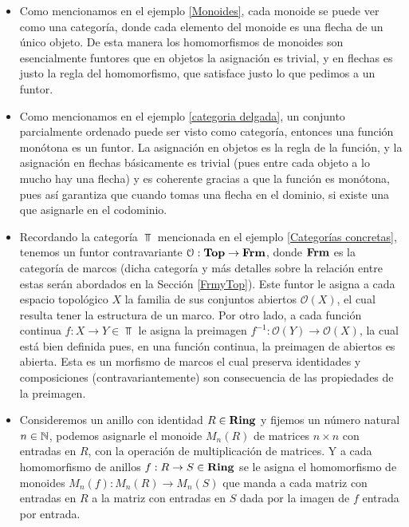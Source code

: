 \documentclass{comunicaciones}
\begin{document}
\begin{ej}
    \begin{itemize}
        \item Como mencionamos en el ejemplo \ref{Monoides}, cada monoide se puede ver como una categoría, donde cada elemento del monoide es una flecha de un
        único objeto. De esta manera los homomorfismos de monoides son esencialmente funtores que en objetos la asignación es trivial, y en flechas es justo la 
        regla del homomorfismo, que satisface justo lo que pedimos a un funtor.
        \item Como mencionamos en el ejemplo \ref{categoria delgada}, un conjunto parcialmente ordenado puede ser visto como categoría, entonces una función
        monótona es un funtor. La asignación en objetos es la regla de la función, y la asignación en flechas básicamente es trivial (pues entre cada objeto a lo
        mucho hay una flecha) y es coherente gracias a que la función es monótona, pues así garantiza que cuando tomas una flecha en el dominio, si existe una
        que asignarle en el codominio.
    \end{itemize}
\end{ej}

\begin{ej}\label{Funtor de abiertos}
    \begin{itemize}
        \item Recordando la categoría $\Top$ mencionada en el ejemplo \ref{Categorías concretas}, tenemos un funtor contravariante $\mathcal O:\mathbf{Top}\to\mathbf{Frm}$, donde $\mathbf{Frm}$ es la categoría de marcos (dicha categoría y más detalles sobre la relación entre estas serán abordados en la Sección \ref{FrmyTop}). Este funtor
        le asigna a cada espacio topológico $X$ la familia de sus conjuntos abiertos $\mathcal O(X)$, el cual resulta tener la estructura de un marco. Por otro lado, a cada función continua $f:X\to Y\in\Top$ le asigna la preimagen
        $f^{-1}:\mathcal O(Y)\to\mathcal O(X)$, la cual está bien definida pues, en una función continua, la preimagen de abiertos es abierta. Esta es un morfismo de marcos el cual preserva identidades y composiciones (contravariantemente) son
        consecuencia de las propiedades de la preimagen.
        \item Consideremos un anillo con identidad $R\in\mathbf{Ring}$ y fijemos un número natural $n\in\mathbb N$, podemos asignarle el monoide $M_n(R)$ de matrices $n\times n$ 
        con entradas en $R$, con la operación de multiplicación de matrices. Y a cada homomorfismo de anillos $f:R\to S\in\mathbf{Ring}$ se le asigna el homomorfismo 
        de monoides $M_n(f):M_n(R)\to M_n(S)$ que manda a cada matriz con entradas en $R$ a la matriz con entradas en $S$ dada por la imagen de $f$ entrada 
        por entrada.
    \end{itemize}
\end{ej}
\end{document}
